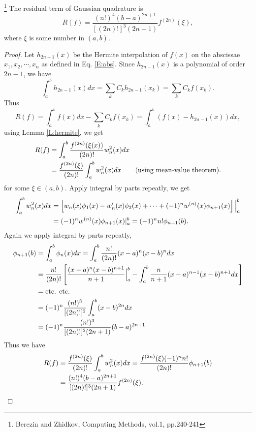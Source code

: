 \begin{lemma}
\footnote{Berezin and Zhidkov, Computing Methods, vol.1, pp.240-241}
The residual term of Gaussian quadrature is
\begin{equation}
  R(f) = \frac{(n!)^4 (b-a)^{2n+1}}{ [(2n)!]^3 (2n+1)} f^{(2n)}(\xi),
\end{equation}
where $\xi$ is some number in $(a,b)$.
\end{lemma}
\begin{proof}
Let $h_{2n-1}(x)$ be the Hermite interpolation of $f(x)$ on the abscissae
$x_1,x_2,\cdots,x_n$ as defined in Eq. \ref{E:abs}. Since $h_{2n-1}(x)$ is a
polynomial of order $2n-1$, we have
\[
  \int_a^b h_{2n-1}(x) dx = \sum_k C_k h_{2n-1}(x_k) = \sum_k C_k f(x_k).
\]
Thus
\[
  R(f) = \int_a^b f(x) dx - \sum_k C_k f(x_k) = \int_a^b (f(x)-h_{2n-1}(x)) dx,
\]
using Lemma \ref{L:hermite}, we get
\begin{align*}
  R(f) &= \int_a^b \frac{f^{(2n)}(\xi(x))}{(2n)!} w_n^2(x) dx \notag \\
       &= \frac{f^{(2n)}(\xi)}{(2n)!} \int_a^b w_n^2(x) dx 
          \qquad \text{(using mean-value theorem)}. \notag \\
\end{align*}
for some $\xi\in (a,b)$.
Apply integral by parts repeatly, we get
\begin{align*}
  \int_a^b w_n^2(x) dx 
   &= \left[
       w_n(x)\phi_1(x) - w'_n(x)\phi_2(x) + \cdots 
       + (-1)^n w^{(n)}(x) \phi_{n+1}(x)
     \right] \Big|_a^b  \notag \\
   &= (-1)^n w^{(n)}(x) \phi_{n+1}(x) |_a^b = (-1)^n n!\phi_{n+1}(b). \notag \\
\end{align*}
Again we apply integral by parts repeatly, 
\begin{align*}
  \phi_{n+1}(b) 
    &= \int_a^b \phi_n(x) dx = \int_a^b \frac{n!}{(2n)!} (x-a)^n (x-b)^n dx
       \notag \\
    &= \frac{n!}{(2n)!} 
       \left[
         \frac{(x-a)^n (x-b)^{n+1}}{n+1}\Big|_a^b
         - \int_a^b \frac{n}{n+1} (x-a)^{n-1} (x-b)^{n+1} dx
       \right]  \notag \\
    &= \text{etc. etc.} \notag \\
    &= (-1)^n \frac{(n!)^3}{[(2n)!]^2} \int_a^b (x-b)^{2n} dx \notag \\
    &= (-1)^n \frac{(n!)^3}{[(2n)!]^2 (2n+1)} (b-a)^{2n+1} \notag \\
\end{align*}
Thus we have
\begin{align*}
  R(f) &= \frac{f^{(2n)}(\xi)}{(2n)!} \int_a^b w_n^2(x) dx 
          = \frac{ f^{(2n)}(\xi) (-1)^n n! }{(2n)!} \phi_{n+1}(b) \notag \\
       &= \frac{(n!)^4 (b-a)^{2n+1}}{ [(2n)!]^3 (2n+1)} f^{(2n)}(\xi). \notag \\
\end{align*}
\end{proof}





